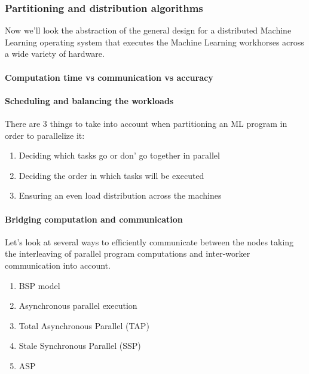 

\subsubsection{Partitioning and distribution algorithms}
Now we'll look the abstraction of the general design for a distributed Machine Learning operating system that executes the Machine Learning workhorses across a wide variety of hardware.


\paragraph{Computation time vs communication vs accuracy}


\paragraph{Scheduling and balancing the workloads}
There are 3 things to take into account when partitioning an ML program in order to parallelize it:\cite{Xing16}\\
\begin{enumerate}
	\item Deciding which tasks go or don' go together in parallel
	\item Deciding the order in which tasks will be executed
	\item Ensuring an even load distribution across the machines
\end{enumerate}


\paragraph{Bridging computation and communication}
Let's look at several ways to efficiently communicate between the nodes taking the interleaving of parallel program computations and inter-worker communication into account.
\begin{enumerate}
	\item BSP model
	\item Asynchronous parallel execution
	\item Total Asynchronous Parallel (TAP)
	\item Stale Synchronous Parallel (SSP)
	\item ASP
\end{enumerate}


